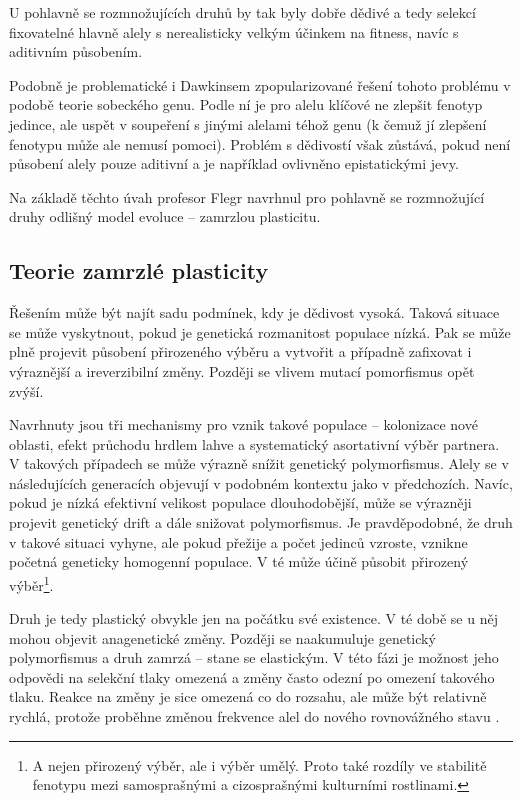 U pohlavně se rozmnožujících druhů by tak byly dobře dědivé a tedy selekcí fixovatelné hlavně alely s nerealisticky
velkým účinkem na fitness, navíc s aditivním působením.

Podobně je problematické i Dawkinsem zpopularizované řešení tohoto problému v podobě teorie sobeckého genu.
Podle ní je pro alelu klíčové ne zlepšit fenotyp jedince, ale uspět v soupeření s jinými alelami téhož genu
(k čemuž jí zlepšení fenotypu může ale nemusí pomoci). Problém s dědivostí však zůstává, pokud není působení
alely pouze aditivní a je například ovlivněno epistatickými jevy.

Na základě těchto úvah profesor Flegr navrhnul pro pohlavně se rozmnožující druhy odlišný model evoluce -- zamrzlou
plasticitu.

\subsection{Teorie zamrzlé plasticity}

Řešením může být najít sadu podmínek, kdy je dědivost vysoká. Taková situace se může vyskytnout, pokud je genetická
rozmanitost populace nízká. Pak se může plně projevit působení přirozeného výběru a vytvořit a případně zafixovat i
výraznější a ireverzibilní změny. Později se vlivem mutací pomorfismus opět zvýší.

Navrhnuty jsou tři mechanismy pro vznik takové populace -- kolonizace nové oblasti, efekt průchodu hrdlem lahve a
systematický asortativní výběr partnera. V takových případech se může výrazně snížit genetický polymorfismus. Alely
se v následujících generacích objevují v podobném kontextu jako v předchozích. Navíc, pokud je nízká efektivní
velikost populace dlouhodobější, může se výrazněji projevit genetický drift a dále snižovat polymorfismus. Je
pravděpodobné, že druh v takové situaci vyhyne, ale pokud přežije a počet jedinců vzroste, vznikne početná geneticky
homogenní populace. V té může účině působit přirozený výběr\footnote{
A nejen přirozený výběr, ale i výběr umělý. Proto také rozdíly ve stabilitě fenotypu mezi samosprašnými a cizosprašnými
kulturními rostlinami.\citep[str. 267--269]{flegr2002lysenko}
}.

Druh je tedy plastický obvykle jen na počátku své existence. V té době se u něj mohou objevit anagenetické změny.
Později se naakumuluje genetický polymorfismus a druh zamrzá -- stane se elastickým. V této fázi je možnost jeho
odpovědi na selekční tlaky omezená a změny často odezní po omezení takového tlaku. Reakce na změny je sice omezená
co do rozsahu, ale může být relativně rychlá, protože proběhne změnou frekvence alel do nového rovnovážného stavu
\citep[str. 194]{flegr2016}.

